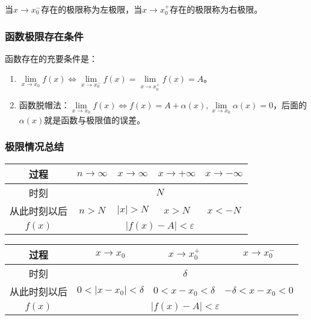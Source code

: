 \documentclass[UTF8, 12pt]{ctexart}
\begin{document}
当$x\to x_0^-$存在的极限称为左极限，当$x\to x_0^+$存在的极限称为右极限。

\subsubsection{函数极限存在条件}

函数存在的充要条件是：

\begin{enumerate}
    \item $\lim\limits_{x\to x_0}f(x)\Leftrightarrow\lim\limits_{x\to x_0^-}f(x)=\lim\limits_{x\to x_0^+}f(x)=A$。
    \item 函数脱帽法：$\lim\limits_{x\to x_0}f(x)\Leftrightarrow f(x)=A+\alpha(x),\lim\limits_{x\to x_0}\alpha(x)=0$，后面的$\alpha(x)$就是函数与极限值的误差。
\end{enumerate}

\subsubsection{极限情况总结}

\begin{center}
    \begin{tabular}{|c|c|c|c|c|}
        \hline
        过程 & $n\to\infty$ & $x\to\infty$ & $x\to+\infty$ & $x\to-\infty$ \\ \hline
        时刻 & \multicolumn{4}{c|}{$N$} \\ \hline
        从此时刻以后 & $n>N$ & $\vert x\vert>N$ & $x>N$ & $x<-N$ \\ \hline
        $f(x)$ & \multicolumn{4}{c|}{$\vert f(x)-A\vert<\varepsilon$} \\ 
        \hline
    \end{tabular}
\end{center}

\begin{center}
    \begin{tabular}{|c|c|c|c|}
        \hline
        过程 & $x\to x_0$ & $x\to x_0^+$ & $x\to x_0^-$ \\ \hline
        时刻 & \multicolumn{3}{c|}{$\delta$} \\ \hline
        从此时刻以后 & $0<\vert x-x_0\vert<\delta$ & $0<x-x_0<\delta$ & $-\delta<x-x_0<0$\\ \hline
        $f(x)$ & \multicolumn{3}{c|}{$\vert f(x)-A\vert<\varepsilon$} \\ 
        \hline
    \end{tabular}
\end{center}
\end{document}
